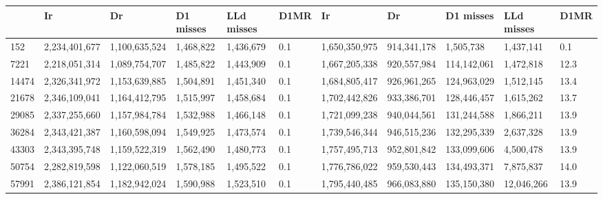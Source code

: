 {\begin{table}[H]
\begin{center}
{\begin{tabular}{lllllllllll}
 & Ir & Dr & D1 misses & LLd misses  & D1MR  
 & Ir & Dr & D1 misses & LLd misses & D1MR  \\
  \midrule
152&2,234,401,677&1,100,635,524&1,468,822&1,436,679&	0.1	&1,650,350,975&914,341,178&1,505,738&1,437,141&	0.1\\
7221&2,218,051,314&1,089,754,707&1,485,822&1,443,909&	0.1	&1,667,205,338&920,557,984&114,142,061&1,472,818&	12.3\\
14474&2,326,341,972&1,153,639,885&1,504,891&1,451,340&	0.1	&1,684,805,417&926,961,265&124,963,029&1,512,145&	13.4\\
21678&2,346,109,041&1,164,412,795&1,515,997&1,458,684&	0.1	&1,702,442,826&933,386,701&128,446,457&1,615,262&	13.7\\
29085&2,337,255,660&1,157,984,784&1,532,988&1,466,148&	0.1	&1,721,099,238&940,044,561&131,244,588&1,866,211&	13.9\\
36284&2,343,421,387&1,160,598,094&1,549,925&1,473,574&	0.1	&1,739,546,344&946,515,236&132,295,339&2,637,328&	13.9\\
43303&2,343,395,748&1,159,522,319&1,562,490&1,480,773&	0.1	&1,757,495,713&952,801,842&133,099,606&4,500,478&	13.9\\
50754&2,282,819,598&1,122,060,519&1,578,185&1,495,522&	0.1	&1,776,786,022&959,530,443&134,493,371&7,875,837&	14.0\\
57991&2,386,121,854&1,182,942,024&1,590,988&1,523,510&	0.1	&1,795,440,485&966,083,880&135,150,380&12,046,266&	13.9\\
  \bottomrule
\end{tabular} }
 \label{tab:Prueba2Cache} 
\end{center}
\end{table}

}
